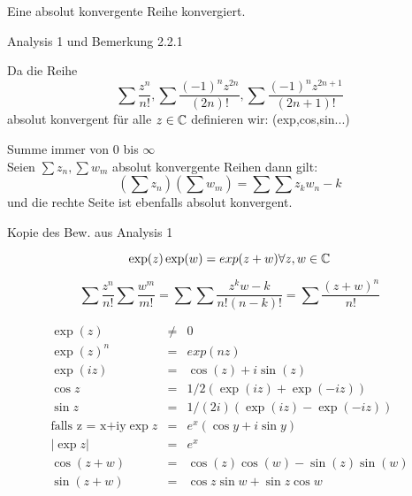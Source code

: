 \begin{beispiel}
\end{beispiel}

\begin{satz}
Eine absolut konvergente Reihe konvergiert.
\end{satz}
\begin{bew}
Analysis 1 und Bemerkung 2.2.1
\end{bew}

\begin{definition}
Da die Reihe
\[
\sum \frac{z^n}{n!}, \sum \frac{(-1)^n z^{2n}}{(2n)!}, \sum \frac{(-1)^nz^{2n+1}}{(2n+1)!}
\]
absolut konvergent für alle $z \in \mathbb{C}$ definieren wir: (exp,cos,sin...)
\end{definition}

\begin{lemma}
Summe immer von 0 bis $\infty$ \\
Seien $\sum z_n, \sum w_m$ absolut konvergente Reihen dann gilt:
\[
(\sum z_n)(\sum w_m) = \sum \sum z_k w_n-k
\]
und die rechte Seite ist ebenfalls absolut konvergent.
\end{lemma}
\begin{bew}
Kopie des Bew. aus Analysis 1
\end{bew}

\begin{satz}
\[
\exp(z) \exp(w) = exp(z+w) \forall z,w \in \mathbb{C}
\]
\end{satz}
\begin{bew}
\[
\sum \frac{z^n}{n!} \sum \frac{w^m}{m!} = \sum \sum \frac{z^kw-k}{n!(n-k)!} = \sum \frac{(z+w)^n}{n!}
\]
\end{bew}

\begin{korollar}
\begin{eqnarray*}
\exp(z) &\neq& 0\\
\exp(z)^n &=& exp(nz)\\
\exp(iz) &=& \cos(z) + i \sin(z)\\
\cos z &=& 1/2 (\exp(iz)+\exp(-iz))\\
\sin z &=& 1/(2i) (\exp(iz)-\exp(-iz))\\
\text{falls z = x+iy} \exp z &=& e^x ( \cos y + i \sin y) \\
|\exp z | &=& e^x\\
\cos(z+w) &=& \cos(z)\cos(w) - \sin(z) \sin(w)\\
\sin(z+w) &=& \cos z \sin w + \sin z \cos w
\end{eqnarray*}
\end{korollar}

